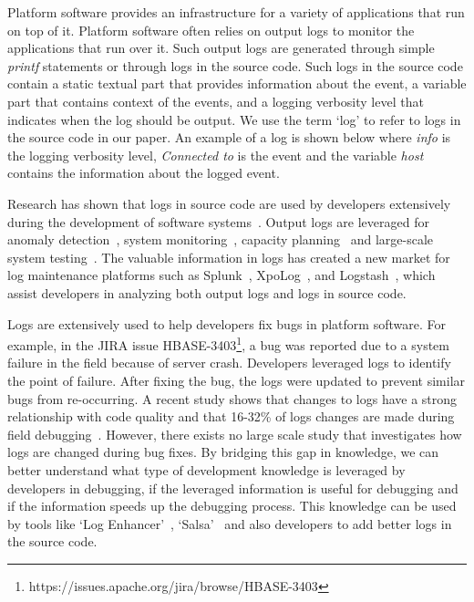 Platform software provides an infrastructure for a variety of applications that run on top of it. Platform software often relies on output logs to monitor the applications that run over it. Such output logs are generated through simple \textsl{printf} statements or through logs in the source code. Such logs in the source code contain a static textual part that provides information about the event,  a variable part that contains context of the events, and a logging verbosity level that indicates when the log should be output. We use the term `log' to refer to logs in the source code in our paper. An example of a log is shown below where \emph{info} is the logging verbosity level, \emph{Connected to} is the event and the variable \emph{host} contains the information about the logged event. 

%
% 

Research has shown that logs in source code are used by developers extensively during the development of software systems~\cite{Characterizinglogs}. Output logs are leveraged for anomaly detection~\cite{XUanomalies,ConsoleLogs,Marksyer}, system monitoring~\cite{Bitperformance}, capacity planning~\cite{IanWCRE} and large-scale system testing~\cite{markTesting}. The valuable information in logs has created a new market for log maintenance platforms such as Splunk~\cite{Bitperformance}, XpoLog~\cite{Xpolog}, and Logstash~\cite{Logstash}, which assist developers in analyzing both output logs and logs in source code.

 
Logs are extensively used to help developers fix bugs in platform software. For example, in the JIRA issue HBASE-3403\footnote{https://issues.apache.org/jira/browse/HBASE-3403}, a bug was reported due to a system failure in the field because of server crash. Developers leveraged logs to identify the point of failure. After fixing the bug, the logs were updated to prevent similar bugs from re-occurring. A recent study shows that changes to logs have a strong relationship with code quality and that 16-32\%
of logs changes are made during field debugging~\cite{EMSEIAN}. However, there exists no large scale study that investigates how logs are changed during bug fixes. By bridging this gap in knowledge, we can better understand what type of development knowledge is leveraged by developers in debugging, if the leveraged information is useful for debugging and if the information speeds up the debugging process. This knowledge can be used by tools like `Log Enhancer'~\cite{Yuan}, `Salsa'~\cite{TanSalsa} and also developers to add better logs in the source code. 

